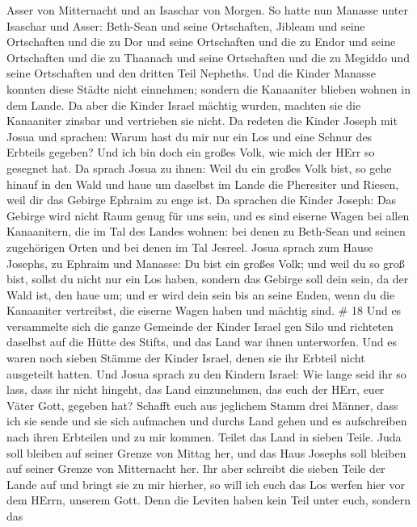 Asser von Mitternacht und an Isaschar von Morgen.  So hatte
nun Manasse unter Isaschar und Asser: Beth-Sean und seine Ortschaften,
Jibleam und seine Ortschaften und die zu Dor und seine Ortschaften und
die zu Endor und seine Ortschaften und die zu Thaanach und seine
Ortschaften und die zu Megiddo und seine Ortschaften und den dritten
Teil Nepheths.  Und die Kinder Manasse konnten diese Städte
nicht einnehmen; sondern die Kanaaniter blieben wohnen in dem Lande.
 Da aber die Kinder Israel mächtig wurden, machten sie die
Kanaaniter zinsbar und vertrieben sie nicht.  Da redeten
die Kinder Joseph mit Josua und sprachen: Warum hast du mir nur ein Los
und eine Schnur des Erbteils gegeben? Und ich bin doch ein großes Volk,
wie mich der HErr so gesegnet hat.  Da sprach Josua zu
ihnen: Weil du ein großes Volk bist, so gehe hinauf in den Wald und haue
um daselbst im Lande die Pheresiter und Riesen, weil dir das Gebirge
Ephraim zu enge ist.  Da sprachen die Kinder Joseph: Das
Gebirge wird nicht Raum genug für uns sein, und es sind eiserne Wagen
bei allen Kanaanitern, die im Tal des Landes wohnen: bei denen zu
Beth-Sean und seinen zugehörigen Orten und bei denen im Tal Jesreel.
 Josua sprach zum Hause Josephs, zu Ephraim und Manasse: Du
bist ein großes Volk; und weil du so groß bist, sollst du nicht nur ein
Los haben,  sondern das Gebirge soll dein sein, da der Wald
ist, den haue um; und er wird dein sein bis an seine Enden, wenn du die
Kanaaniter vertreibst, die eiserne Wagen haben und mächtig sind. \# 18
 Und es versammelte sich die ganze Gemeinde der Kinder
Israel gen Silo und richteten daselbst auf die Hütte des Stifts, und das
Land war ihnen unterworfen.  Und es waren noch sieben Stämme
der Kinder Israel, denen sie ihr Erbteil nicht ausgeteilt hatten.
 Und Josua sprach zu den Kindern Israel: Wie lange seid ihr
so lass, dass ihr nicht hingeht, das Land einzunehmen, das euch der
HErr, euer Väter Gott, gegeben hat?  Schafft euch aus
jeglichem Stamm drei Männer, dass ich sie sende und sie sich aufmachen
und durchs Land gehen und es aufschreiben nach ihren Erbteilen und zu
mir kommen.  Teilet das Land in sieben Teile. Juda soll
bleiben auf seiner Grenze von Mittag her, und das Haus Josephs soll
bleiben auf seiner Grenze von Mitternacht her.  Ihr aber
schreibt die sieben Teile der Lande auf und bringt sie zu mir hierher,
so will ich euch das Los werfen hier vor dem HErrn, unserem Gott.
 Denn die Leviten haben kein Teil unter euch, sondern das
